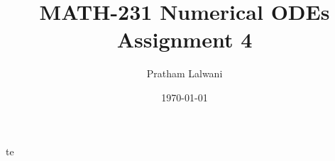 \documentclass{report}
\title{\Huge{MATH-231 Numerical ODEs}\\Assignment 4}
\author{\huge{Pratham Lalwani}}
\date{\today}
\begin{document}
\begin{solution}
	te
\end{solution}
\end{document}
